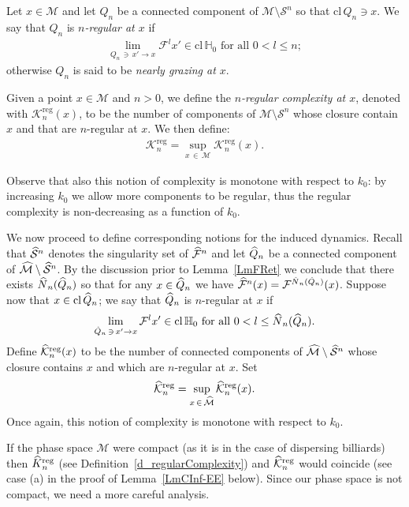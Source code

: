 \documentclass[AHL, Unicode, longabstracts,published]{cedram}
\newcommand{\cl}[1]{\mathrm{cl}\,#1}
\newcommand{\homo}{\mathbb{H}}
\newcommand{\cm}{\mathcal{F}}
\newcommand{\csp}{\mathcal{M}}
\newcommand{\cmp}{\hat\cm}
\newcommand{\cspi}{\widehat{\csp}}
\newcommand{\singPrivate}{\mathcal{S}}
\newcommand{\sing}[1]{\singPrivate^{#1}}
\newcommand{\singp}[1]{\hat{\singPrivate}^{#1}}
\newcommand{\cc}{\hat Q}
\newcommand{\ckreg}{\mathcal{K}^\text{reg}}
\newcommand{\ckregp}{\hat{\mathcal{K}}^\text{reg}}
\newcommand{\hkreg}{\hat{K}^\text{reg}}
\newcommand{\kregp}{\hkreg}
\newcommand{\Np}{\hat N}
\let\oldhat\hat
\renewcommand*{\hat}[1]{\mathchoice{\widehat{#1}}{\widehat{#1}}{\oldhat{#1}}{\oldhat{#1}}}
\begin{document}
Let $x\in\csp$ and let $Q_n$ be a connected component of $\csp\setminus\sing n$ so that $\cl Q_n\ni x$. We say that $Q_n$ is
\emph{$n$-regular at $x$} if
\begin{align*}
\lim_{Q_n\,\ni\,x'\to x}\cm^{l}x'\in \cl\homo_0\text{ for all $0 < l\le n$};
\end{align*}
otherwise $Q_n$ is said to be \emph{nearly grazing at $x$}.

\begin{defi}\label{d_regular pointwise complexity}
Given a point $x\in\csp$ and $n > 0$, we define the \emph{$n$-regular complexity at $x$}, denoted with $\ckreg_n(x)$, to be the number of components of $\csp\setminus\sing n$ whose closure contain $x$ and that are $n$-regular at $x$. We then define:
\begin{align*}
\ckreg_n = \sup_{x\,\in\,\csp}\ckreg_n(x).
\end{align*}
\end{defi}

Observe that also this notion of complexity is monotone with respect to $k_{0}$: by increasing $k_{0}$ we allow more components to be regular, thus the regular complexity is non-decreasing as a function of $k_{0}$.

We now proceed to define corresponding notions for the induced dynamics. Recall that $\singp{n}$ denotes the singularity set of $\cmp^{n}$ and let $\hat Q_n$ be a connected component of $\cspi\setminus\singp{n}$. By the discussion prior to Lemma~\ref{LmFRet} we conclude that there exists $\Np_n(\cc_n)$ so that for any $x\in\hat Q_n$ we have $\cmp^n(x) = \cm^{\Np_n(\cc_n)}(x)$. Suppose now that $x\in\cl\hat Q_n$; we say that $\hat Q_n$ is $n$-regular at $x$ if
\begin{align*}
\lim_{\hat Q_n\,\ni\,x'\to x}\cm^{l}x'\in \cl\homo_0\text{ for all }0 < l\le \Np_n(\cc_n).
\end{align*}
Define $\ckregp_n(x)$ to be the number of connected components of $\cspi\setminus\singp{n}$ whose closure contains $x$ and which are $n$-regular at $x$. Set
\begin{align}\label{e_defInducedRegularComplexity}
\ckregp_n = \sup_{x\,\in\,\cspi}\ckregp_n(x).
\end{align}
Once again, this notion of complexity is monotone with respect to $k_{0}$.


If the phase space $\csp$ were compact (as it is in the case of dispersing billiards) then $\kregp_n$ (see Definition~\ref{d_regularComplexity}) and $\ckregp_n$ would coincide (see case (a) in the proof of Lemma~\ref{LmCInf-EE} below). Since our phase space is not compact, we need a more careful analysis.
\end{document}
